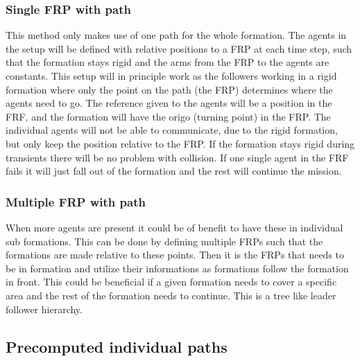 \subsubsection{Single \ac{FRP} with path}
This method only makes use of one path for the whole formation. The agents in the setup will be defined with relative positions to a \ac{FRP} at each time step, such that the formation stays rigid and the arms from the \ac{FRP} to the agents are constants. This setup will in principle work as the followers working in a rigid formation where only the point on the path (the \ac{FRP}) determines where the agents need to go. The reference given to the agents will be a position in the \ac{FRF}, and the formation will have the origo (turning point) in the \ac{FRP}. The individual agents will not be able to communicate, due to the rigid formation, but only keep the position relative to the \ac{FRP}. If the formation stays rigid during transients there will be no problem with collision. If one single agent in the \ac{FRF} fails it will just fall out of the formation and the rest will continue the mission.

\subsubsection{Multiple \ac{FRP} with path}
When more agents are present it could be of benefit to have these in individual sub formations. This can be done by defining multiple \ac{FRP}s such that the formations are made relative to these points. Then it is the \ac{FRP}s that needs to be in formation and utilize their informations as formations follow the formation in front. This could be beneficial if a given formation needs to cover a specific area and the rest of the formation needs to continue. This is a tree like leader follower hierarchy.

\subsection{Precomputed individual paths}
